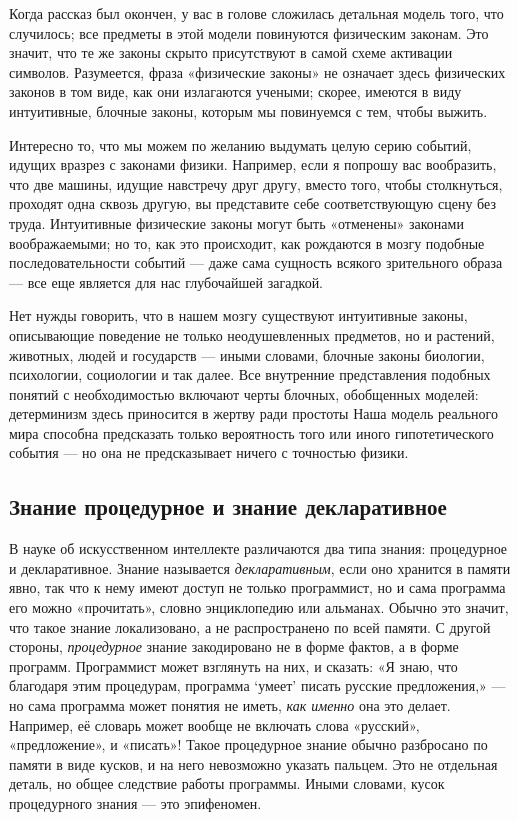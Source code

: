\documentclass[../main.tex]{subfiles}
\begin{document}
Когда рассказ был окончен, у вас в голове сложилась детальная модель того, что случилось; все предметы в этой модели повинуются физическим законам. Это значит, что те же законы скрыто присутствуют в самой схеме активации символов. Разумеется, фраза «физические законы» не означает здесь физических законов в том виде, как они излагаются учеными; скорее, имеются в виду интуитивные, блочные законы, которым мы повинуемся с тем, чтобы выжить.

Интересно то, что мы можем по желанию выдумать целую серию событий, идущих вразрез с законами физики. Например, если я попрошу вас вообразить, что две машины, идущие навстречу друг другу, вместо того, чтобы столкнуться, проходят одна сквозь другую, вы представите себе соответствующую сцену без труда. Интуитивные физические законы могут быть «отменены» законами воображаемыми; но то, как это происходит, как рождаются в мозгу подобные последовательности событий --- даже сама сущность всякого зрительного образа --- все еще является для нас глубочайшей загадкой.

Нет нужды говорить, что в нашем мозгу существуют интуитивные законы, описывающие поведение не только неодушевленных предметов, но и растений, животных, людей и государств --- иными словами, блочные законы биологии, психологии, социологии и так далее. Все внутренние представления подобных понятий с необходимостью включают черты блочных, обобщенных моделей: детерминизм здесь приносится в жертву ради простоты Наша модель реального мира способна предсказать только вероятность того или иного гипотетического события --- но она не предсказывает ничего с точностью физики.

\subsection{Знание процедурное и знание декларативное}

В науке об искусственном интеллекте различаются два типа знания: процедурное и декларативное. Знание называется \emph{декларативным}, если оно хранится в памяти явно, так что к нему имеют доступ не только программист, но и сама программа его можно «прочитать», словно энциклопедию или альманах. Обычно это значит, что такое знание локализовано, а не распространено по всей памяти. С другой стороны, \emph{процедурное} знание закодировано не в форме фактов, а в форме программ. Программист может взглянуть на них, и сказать: «Я знаю, что благодаря этим процедурам, программа \enquote*{умеет} писать русские предложения,» --- но сама программа может понятия не иметь, \emph{как именно} она это делает. Например, её словарь может вообще не включать слова «русский», «предложение», и «писать»! Такое процедурное знание обычно разбросано по памяти в виде кусков, и на него невозможно указать пальцем. Это не отдельная деталь, но общее следствие работы программы. Иными словами, кусок процедурного знания --- это эпифеномен.
\end{document}
